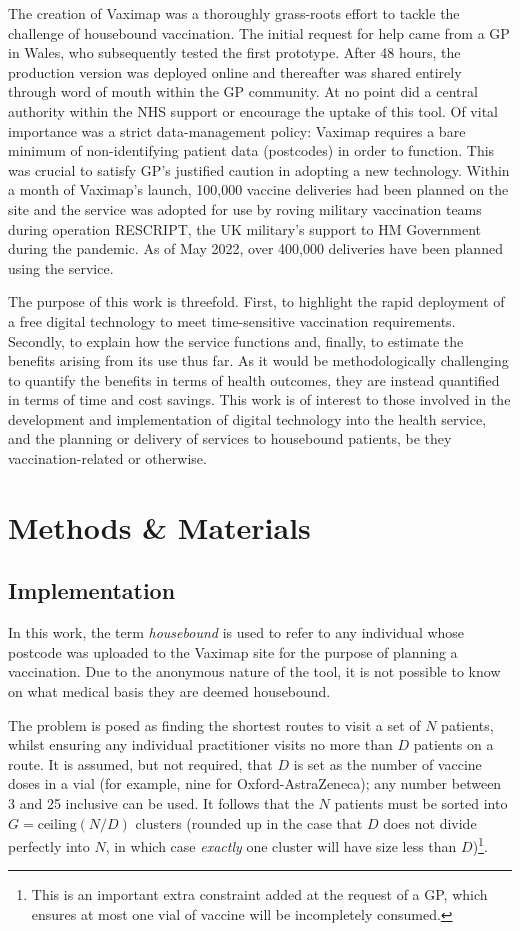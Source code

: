 \documentclass{article}
\def\vm{Vaximap}
\begin{document}
The creation of \vm{} was a thoroughly grass-roots effort to tackle the challenge of housebound vaccination. The initial request for help came from a GP in Wales, who subsequently tested the first prototype. After 48 hours, the production version was deployed online and thereafter was shared entirely through word of mouth within the GP community. At no point did a central authority within the NHS support or encourage the uptake of this tool. Of vital importance was a strict data-management policy: \vm{} requires a bare minimum of non-identifying patient data (postcodes) in order to function. This was crucial to satisfy GP's justified caution in adopting a new technology. Within a month of \vm{}'s launch, 100,000 vaccine deliveries had been planned on the site and the service was adopted for use by roving military vaccination teams during operation RESCRIPT, the UK military's support to HM Government during the pandemic. As of May 2022, over 400,000 deliveries have been planned using the service.

The purpose of this work is threefold. First, to highlight the rapid deployment of a free digital technology to meet time-sensitive vaccination requirements. Secondly, to explain how the service functions and, finally, to estimate the benefits arising from its use thus far. As it would be methodologically challenging to quantify the benefits in terms of health outcomes, they are instead quantified in terms of time and cost savings. This work is of interest to those involved in the development and implementation of digital technology into the health service, and the planning or delivery of services to housebound patients, be they vaccination-related or otherwise.

\section{Methods \& Materials}
\subsection{Implementation}

In this work, the term \textit{housebound} is used to refer to any individual whose postcode was uploaded to the \vm{} site for the purpose of planning a vaccination. Due to the anonymous nature of the tool, it is not possible to know on what medical basis they are deemed housebound. 

The problem is posed as finding the shortest routes to visit a set of $N$ patients, whilst ensuring any individual practitioner visits no more than $D$ patients on a route. It is assumed, but not required, that $D$ is set as the number of vaccine doses in a vial (for example, nine for Oxford-AstraZeneca); any number between 3 and 25 inclusive can be used. It follows that the $N$ patients must be sorted into $G = \mathrm{ceiling}(N/D)$ clusters (rounded up in the case that $D$ does not divide perfectly into $N$, in which case \textit{exactly} one cluster will have size less than $D$)\footnote{This is an important extra constraint added at the request of a GP, which ensures at most one vial of vaccine will be incompletely consumed.}. 
\end{document}
